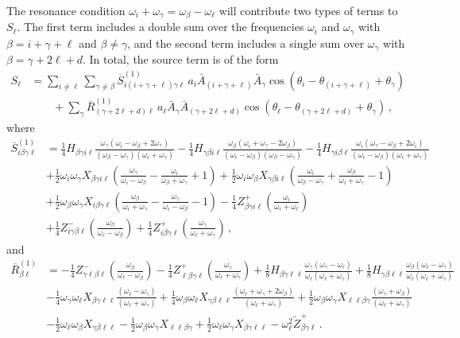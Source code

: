 \documentclass[letterpaper,11pt]{article}
\newcommand{\oi}{\omega_i}
\newcommand{\ol}{\omega_\ell}
\newcommand{\obet}{\omega_{\beta}}
\newcommand{\ogam}{\omega_\gamma}
\begin{document}
The resonance condition $\oi + \ogam = \obet - \ol$ will contribute two types of terms to $S_\ell$. The first term includes a double sum over the frequencies $\omega_i$ and $\omega_\gamma$ with $\beta = i + \gamma + \ell$ and $\beta \neq \gamma$, and the second term includes a single sum over $\omega_\gamma$ with $\beta = \gamma + 2\ell + d$. In total, the source term is of the form
\begin{align}
\label{intpluschi1 source}
S_\ell &= \sum_{i \neq \ell} \sum_{\gamma \neq \beta} \overline{S}^{(1)}_{i (i + \gamma + \ell) \gamma \ell} \, a_i \bar A_{(i + \gamma + \ell)} \bar A_\gamma \cos \left( \theta_i - \theta_{(i + \gamma + \ell)} + \theta_\gamma \right) \nonumber \\
%
& \qquad + \sum_\gamma \overline{R}^{(1)}_{(\gamma + 2\ell + d) \ell} \, a_\ell \bar A_\gamma \bar A_{(\gamma + 2\ell + d)}  \cos \left(\theta_\ell - \theta_{(\gamma + 2\ell + d)} + \theta_\gamma \right)  \, ,
\end{align}
where 
\begin{align}
\overline{S}^{(1)}_{i \beta\gamma\ell} &= \frac{1}{4} H_{\beta\gamma i \ell} \frac{ \ogam (\oi - \obet + 2\ogam)}{(\obet - \ogam)(\oi + \ogam)} - \frac{1}{4} H_{\gamma\beta i \ell} \frac{\obet(\oi + \ogam - 2\obet)}{(\oi - \obet)(\obet - \ogam)} - \frac{1}{4} H_{\gamma i \beta\ell} \frac{\oi (\ogam - \obet + 2\oi)}{(\oi - \obet)(\oi + \ogam)} \nonumber \\
%
& + \frac{1}{2} \oi \ogam X_{\beta\gamma i \ell} \left( \frac{\ogam}{\oi - \obet} - \frac{\oi}{\obet + \ogam} + 1 \right) + \frac{1}{2} \oi \obet X_{\gamma\beta i \ell} \left( \frac{\oi}{\obet - \ogam} + \frac{\obet}{\oi + \ogam} - 1 \right) \nonumber \\
%
& + \frac{1}{2} \obet \ogam X_{i\beta\gamma\ell} \left(\frac{\obet}{\oi + \ogam} - \frac{\ogam}{\oi - \obet} - 1 \right) - \frac{1}{4} Z^+_{\beta\gamma i \ell} \left( \frac{\oi}{\oi + \ol}\right)  \nonumber \\
%
& + \frac{1}{4} Z^{-}_{i\gamma\beta\ell} \left(  \frac{\obet}{\ol - \obet}  \right) + \frac{1}{4} Z^+_{i\beta\gamma\ell} \left( \frac{\ogam}{\ol + \ogam} \right) \, ,
\end{align}
and
\begin{align}
\overline{R}^{(1)}_{\beta \ell} &= -\frac{1}{4} Z^{-}_{\gamma \ell \beta \ell} \left( \frac{\obet}{\ol - \obet} \right) -  \frac{1}{4} Z^+_{\ell \beta \gamma \ell} \left(\frac{\ogam}{\ol + \ogam} \right) + \frac{1}{8} H_{\beta\gamma\ell\ell} \frac{\ogam (\ogam - \ol)}{\ol (\ol + \ogam)} + \frac{1}{8} H_{\gamma\beta\ell\ell} \frac{\obet (\ol - \ogam)}{\ol (\ol + \ogam)} \nonumber \\
%
& - \frac{1}{4}\ogam\ol X_{\beta\gamma\ell\ell}\frac{(\ol - \ogam)}{(\ol + \ogam)} + \frac{1}{4} \obet \ol X_{\gamma\beta\ell\ell} \frac{(\ol + \ogam + 2\obet)}{(\ol + \ogam)} + \frac{1}{2} \obet \ogam X_{\ell\ell\beta\gamma} \frac{(\ogam + \obet)}{(\ol + \ogam)} \nonumber \\
%
& -\frac{1}{2} \ol \obet X_{\gamma\beta\ell\ell} - \frac{1}{2}\obet \ogam X_{\ell\ell\beta\gamma} + \frac{1}{2} \ol \ogam X_{\beta\gamma\ell\ell} - \ol^2 \tilde{Z}^+_{\beta\gamma\ell} \, .
\end{align}
\end{document}
